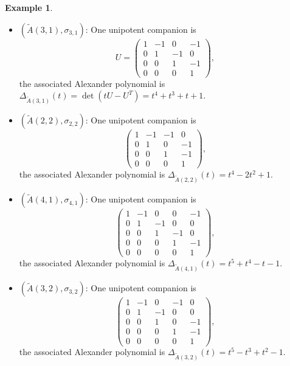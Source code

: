 \documentclass[11pt, letterpaper]{amsart}
\theoremstyle{definition}
\newtheorem{example}[theorem]{Example}
\numberwithin{equation}{section}
\begin{document}
\begin{example}
{\begin{itemize}
\item  $(\tilde A(3, 1), \sigma_{3,1})$: One unipotent companion is
$$U = \begin{pmatrix}
1 & -1 & 0 & -1 \\
0 & 1 & -1 & 0 \\
0 & 0 & 1 & -1 \\
0 & 0 & 0 & 1 
\end{pmatrix},$$
the associated Alexander polynomial is $\Delta_{\tilde A(3,1)}(t) =\det(t U - U^T) = t^4 + t^3 + t + 1$.
\item  $(\tilde A(2, 2), \sigma_{2,2})$: One unipotent companion is
$$\begin{pmatrix}
1 & -1 & -1 & 0 \\
0 & 1 & 0 & -1 \\
0 & 0 & 1 & -1 \\
0 & 0 & 0 & 1 
\end{pmatrix},$$
the associated Alexander polynomial is $\Delta_{\tilde A(2,2)}(t) =t^4 - 2 t^2 + 1$. 
\item  $(\tilde A(4, 1), \sigma_{4,1})$: One unipotent companion is
$$\begin{pmatrix}
1 & -1 & 0 & 0 & -1 \\
0 & 1 & -1 & 0 & 0 \\
0 & 0 & 1 & -1 & 0 \\
0 & 0 & 0 & 1 & -1 \\
0 & 0 & 0 & 0 & 1
\end{pmatrix},$$
the associated Alexander polynomial is $\Delta_{\tilde A(4,1)}(t) =t^5 + t^4 - t - 1$.
\item  $(\tilde A(3, 2), \sigma_{3,2})$: One unipotent companion is
$$\begin{pmatrix}
1 & -1 & 0 & -1 & 0 \\
0 & 1 & -1 & 0 & 0 \\
0 & 0 & 1 & 0 & -1 \\
0 & 0 & 0 & 1 & -1 \\
0 & 0 & 0 & 0 & 1
\end{pmatrix},$$
the associated Alexander polynomial is $\Delta_{\tilde A(3,2)}(t) =t^5 - t^3 + t^2 - 1$.
\end{itemize}
}
\end{example}
\end{document}
